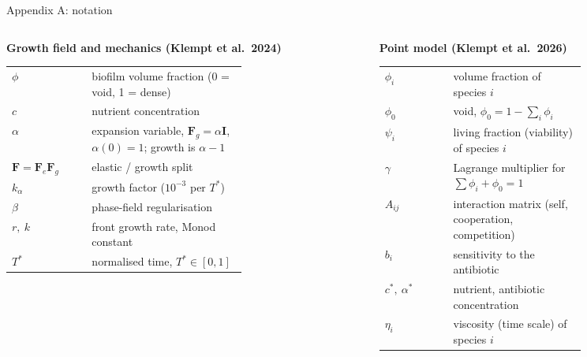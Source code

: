 \documentclass[aspectratio=169,11pt]{beamer}
\begin{document}
\appendix
\begin{frame}{Appendix A: notation}
\scriptsize
\begin{columns}[T]
\begin{column}{0.5\textwidth}
\textbf{Growth field and mechanics (Klempt et al.\ 2024)}\\[2pt]
\begin{tabular}{@{}l>{\raggedright\arraybackslash}p{0.66\linewidth}@{}}
\toprule
$\phi$ & biofilm volume fraction (0 = void, 1 = dense)\\
$c$ & nutrient concentration\\
$\alpha$ & expansion variable, $\mathbf F_g=\alpha\mathbf I$, $\alpha(0)=1$; growth is $\alpha-1$\\
$\mathbf F=\mathbf F_e\mathbf F_g$ & elastic / growth split\\
$k_\alpha$ & growth factor ($10^{-3}$ per $T^*$)\\
$\beta$ & phase-field regularisation\\
$r,\ k$ & front growth rate, Monod constant\\
$T^*$ & normalised time, $T^*\in[0,1]$\\
\bottomrule
\end{tabular}
\end{column}
\begin{column}{0.48\textwidth}
\textbf{Point model (Klempt et al.\ 2026)}\\[2pt]
\begin{tabular}{@{}l>{\raggedright\arraybackslash}p{0.66\linewidth}@{}}
\toprule
$\phi_i$ & volume fraction of species $i$\\
$\phi_0$ & void, $\phi_0=1-\sum_i\phi_i$\\
$\psi_i$ & living fraction (viability) of species $i$\\
$\gamma$ & Lagrange multiplier for $\sum\phi_i+\phi_0=1$\\
$A_{ij}$ & interaction matrix (self, cooperation, competition)\\
$b_i$ & sensitivity to the antibiotic\\
$c^*,\ \alpha^*$ & nutrient, antibiotic concentration\\
$\eta_i$ & viscosity (time scale) of species $i$\\
\bottomrule
\end{tabular}\\[6pt]

\end{column}
\end{columns}
\end{frame}
\end{document}
